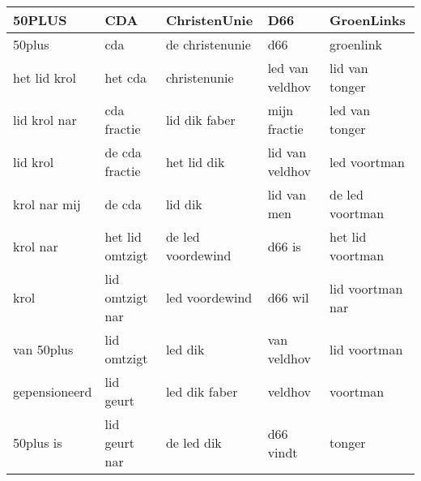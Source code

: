 \begin{tabular}{lllll}
\toprule
        50PLUS &              CDA &       ChristenUnie &              D66 &        GroenLinks \\
\midrule
        50plus &              cda &    de christenunie &              d66 &         groenlink \\
  het lid krol &          het cda &       christenunie &  led van veldhov &    lid van tonger \\
  lid krol nar &      cda fractie &      lid dik faber &     mijn fractie &    led van tonger \\
      lid krol &   de cda fractie &        het lid dik &  lid van veldhov &      led voortman \\
  krol nar mij &           de cda &            lid dik &      lid van men &   de led voortman \\
      krol nar &  het lid omtzigt &  de led voordewind &           d66 is &  het lid voortman \\
          krol &  lid omtzigt nar &     led voordewind &          d66 wil &  lid voortman nar \\
    van 50plus &      lid omtzigt &            led dik &      van veldhov &      lid voortman \\
 gepensioneerd &        lid geurt &      led dik faber &          veldhov &          voortman \\
     50plus is &    lid geurt nar &         de led dik &        d66 vindt &            tonger \\
\bottomrule
\end{tabular}

